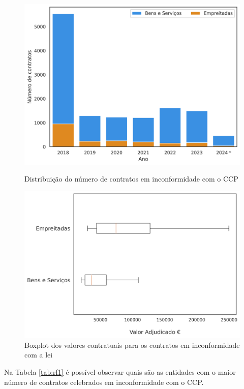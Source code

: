 \begin{figure}[H]
	\centering
	\begin{minipage}{.45\linewidth}
		\includegraphics[width=\linewidth]{imagens/rf1/dist.png}
		\caption{Distribuição do número de contratos em inconformidade com o CCP}
		
	\end{minipage}
	\hfill
	\begin{minipage}{.5\linewidth}
		\includegraphics[width=\linewidth]{imagens/rf1/boxplot.png}
		\caption{Boxplot dos valores contratuais para os contratos em inconformidade com a lei}
		
	\end{minipage}
\end{figure}


Na Tabela \ref{tab:rf1} é possível observar quais são as entidades com o maior número de contratos celebrados em inconformidade com o CCP. 


